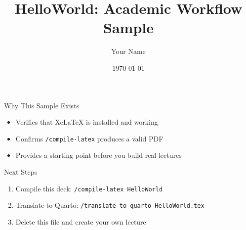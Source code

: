\documentclass{beamer}
\title{HelloWorld: Academic Workflow Sample}
\author{Your Name}
\institute{Your Institution}
\date{\today}
\begin{document}
\frame{\titlepage}

\begin{frame}{Why This Sample Exists}
    \begin{itemize}
        \item Verifies that XeLaTeX is installed and working
        \item Confirms \texttt{/compile-latex} produces a valid PDF
        \item Provides a starting point before you build real lectures
    \end{itemize}
\end{frame}

\begin{frame}{Next Steps}
    \begin{enumerate}
        \item Compile this deck: \texttt{/compile-latex HelloWorld}
        \item Translate to Quarto: \texttt{/translate-to-quarto HelloWorld.tex}
        \item Delete this file and create your own lecture
    \end{enumerate}
\end{frame}
\end{document}
